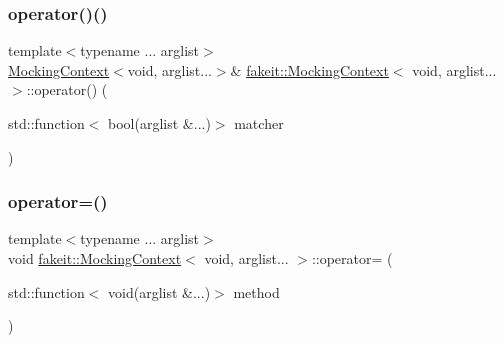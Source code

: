 \subsubsection{\texorpdfstring{operator()()}{operator()()}\hspace{0.1cm}{\footnotesize\ttfamily [18/18]}}
{\footnotesize\ttfamily template$<$typename ... arglist$>$ \\
\mbox{\hyperlink{classfakeit_1_1MockingContext}{Mocking\+Context}}$<$void, arglist...$>$\& \mbox{\hyperlink{classfakeit_1_1MockingContext}{fakeit\+::\+Mocking\+Context}}$<$ void, arglist... $>$\+::operator() (\begin{DoxyParamCaption}\item[{std\+::function$<$ bool(arglist \&...)$>$}]{matcher }\end{DoxyParamCaption})\hspace{0.3cm}{\ttfamily [inline]}}

\mbox{\label{classfakeit_1_1MockingContext_3_01void_00_01arglist_8_8_8_01_4_a86584df9e9a7a73b078ad68fa5893d50}} 
\subsubsection{\texorpdfstring{operator=()}{operator=()}\hspace{0.1cm}{\footnotesize\ttfamily [1/9]}}
{\footnotesize\ttfamily template$<$typename ... arglist$>$ \\
void \mbox{\hyperlink{classfakeit_1_1MockingContext}{fakeit\+::\+Mocking\+Context}}$<$ void, arglist... $>$\+::operator= (\begin{DoxyParamCaption}\item[{std\+::function$<$ void(arglist \&...)$>$}]{method }\end{DoxyParamCaption})\hspace{0.3cm}{\ttfamily [inline]}}

\mbox{\label{classfakeit_1_1MockingContext_3_01void_00_01arglist_8_8_8_01_4_a86584df9e9a7a73b078ad68fa5893d50}} 
